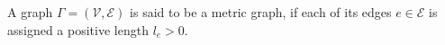 \begin{definition}\label{metric graph}
    A graph $\Gamma = (\mathcal{V}, \mathcal{E})$ is said to be a metric graph, if each of its edges $e \in \mathcal{E}$ is assigned a positive length $l_e > 0$.
\end{definition}


